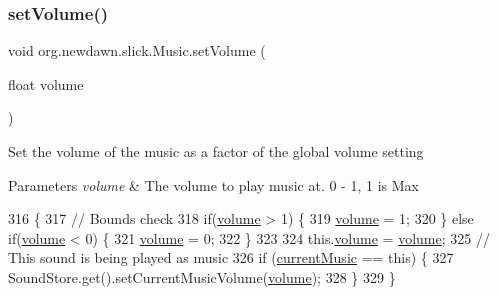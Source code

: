 \subsubsection{\texorpdfstring{set\+Volume()}{setVolume()}}
{\footnotesize\ttfamily void org.\+newdawn.\+slick.\+Music.\+set\+Volume (\begin{DoxyParamCaption}\item[{float}]{volume }\end{DoxyParamCaption})\hspace{0.3cm}{\ttfamily [inline]}}

Set the volume of the music as a factor of the global volume setting


\begin{DoxyParams}{Parameters}
{\em volume} & The volume to play music at. 0 -\/ 1, 1 is Max \\
\hline
\end{DoxyParams}

\begin{DoxyCode}
316                                         \{
317         \textcolor{comment}{// Bounds check}
318         \textcolor{keywordflow}{if}(\mbox{\hyperlink{classorg_1_1newdawn_1_1slick_1_1_music_a2fa10b80767b1a05925e1dc89a088e90}{volume}} > 1) \{
319             \mbox{\hyperlink{classorg_1_1newdawn_1_1slick_1_1_music_a2fa10b80767b1a05925e1dc89a088e90}{volume}} = 1;
320         \} \textcolor{keywordflow}{else} \textcolor{keywordflow}{if}(\mbox{\hyperlink{classorg_1_1newdawn_1_1slick_1_1_music_a2fa10b80767b1a05925e1dc89a088e90}{volume}} < 0) \{
321             \mbox{\hyperlink{classorg_1_1newdawn_1_1slick_1_1_music_a2fa10b80767b1a05925e1dc89a088e90}{volume}} = 0;
322         \}
323         
324         this.\mbox{\hyperlink{classorg_1_1newdawn_1_1slick_1_1_music_a2fa10b80767b1a05925e1dc89a088e90}{volume}} = \mbox{\hyperlink{classorg_1_1newdawn_1_1slick_1_1_music_a2fa10b80767b1a05925e1dc89a088e90}{volume}};
325         \textcolor{comment}{// This sound is being played as music}
326         \textcolor{keywordflow}{if} (\mbox{\hyperlink{classorg_1_1newdawn_1_1slick_1_1_music_a74d1b5592170c007631f4d3b7789dbbf}{currentMusic}} == \textcolor{keyword}{this}) \{
327             SoundStore.get().setCurrentMusicVolume(\mbox{\hyperlink{classorg_1_1newdawn_1_1slick_1_1_music_a2fa10b80767b1a05925e1dc89a088e90}{volume}});
328         \}
329     \}
\end{DoxyCode}
\mbox{\label{classorg_1_1newdawn_1_1slick_1_1_music_afe4ced4d5134a3bfea291254e6fd2934}} 
